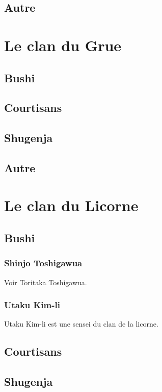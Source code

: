 \documentclass[10pt,a4paper]{book}
\begin{document}
\section{Autre}


\chapter{Le clan du Grue}

\section{Bushi}

\section{Courtisans}

\section{Shugenja}

\section{Autre}


\chapter{Le clan du Licorne}

\section{Bushi}

\subsection{Shinjo Toshigawua}
Voir Toritaka Toshigawua.

\subsection{Utaku Kim-li}

Utaku Kim-li est une sensei du clan de la licorne. 

\section{Courtisans}

\section{Shugenja}
\end{document}
